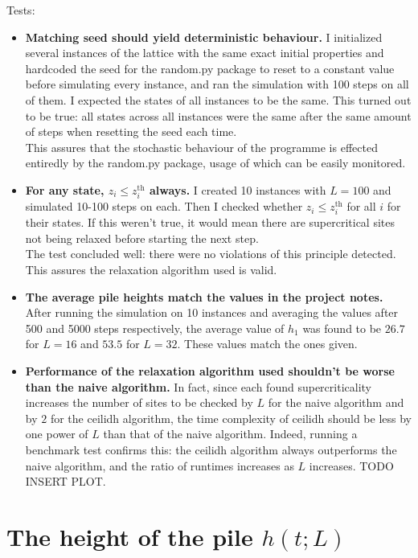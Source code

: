 \documentclass[a4paper,12pt]{article}
\begin{document}
Tests:
\begin{itemize}
\item \textbf{Matching seed should yield deterministic behaviour.} I initialized several instances of the lattice with the same exact initial properties and hardcoded the seed for the random.py package to reset to a constant value before simulating every instance, and ran the simulation with 100 steps on all of them. I expected the states of all instances to be the same. This turned out to be true: all states across all instances were the same after the same amount of steps when resetting the seed each time.\\
This assures that the stochastic behaviour of the programme is effected entiredly by the random.py package, usage of which can be easily monitored.

\item \textbf{For any state, $z_i\leq z^{\mathrm{th}}_i$ always.} I created 10 instances with $L=100$ and simulated 10-100 steps on each. Then I checked whether $z_i\leq z^{\mathrm{th}}_i$ for all $i$ for their states. If this weren't true, it would mean there are supercritical sites not being relaxed before starting the next step.\\
The test concluded well: there were no violations of this principle detected. This assures the relaxation algorithm used is valid.

\item \textbf{The average pile heights match the values in the project notes.} After running the simulation on 10 instances and averaging the values after 500 and 5000 steps respectively, the average value of $h_1$ was found to be $26.7$ for $L=16$ and $53.5$ for $L=32$. These values match the ones given.

\item \textbf{Performance of the relaxation algorithm used shouldn't be worse than the naive algorithm.} In fact, since each found supercriticality increases the number of sites to be checked by $L$ for the naive algorithm and by $2$ for the ceilidh algorithm, the time complexity of ceilidh should be less by one power of $L$ than that of the naive algorithm. Indeed, running a benchmark test confirms this: the ceilidh algorithm always outperforms the naive algorithm, and the ratio of runtimes increases as $L$ increases. TODO INSERT PLOT.
\end{itemize}

\section{The height of the pile $h(t; L)$}
\end{document}
